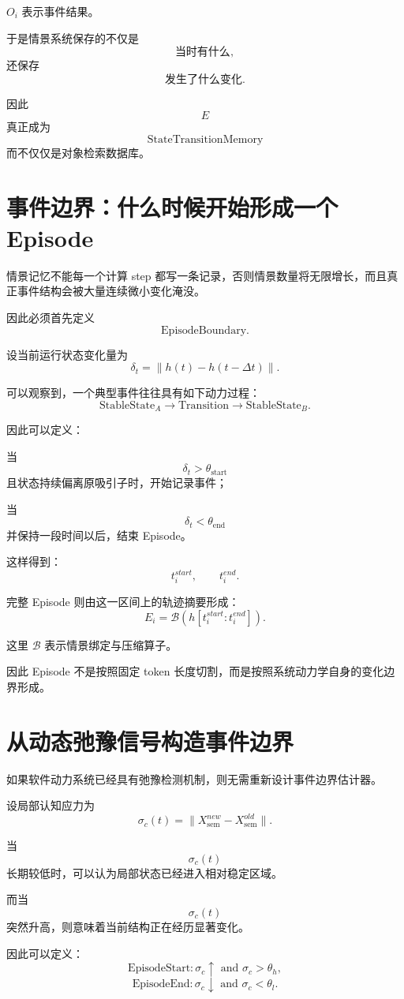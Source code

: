$O_i$ 表示事件结果。

于是情景系统保存的不仅是
\[
\text{当时有什么},
\]
还保存
\[
\boxed{
\text{发生了什么变化}.
}
\]

因此
\[
E
\]
真正成为
\[
\boxed{
\mathrm{StateTransitionMemory}
}
\]
而不仅仅是对象检索数据库。

\section{事件边界：什么时候开始形成一个Episode}

情景记忆不能每一个计算 step 都写一条记录，否则情景数量将无限增长，而且真正事件结构会被大量连续微小变化淹没。

因此必须首先定义
\[
\boxed{
\mathrm{EpisodeBoundary}.
}
\]

设当前运行状态变化量为
\[
\delta_t
=
\|h(t)-h(t-\Delta t)\|.
\]

可以观察到，一个典型事件往往具有如下动力过程：
\[
\boxed{
\mathrm{StableState}_A
\rightarrow
\mathrm{Transition}
\rightarrow
\mathrm{StableState}_B.
}
\]

因此可以定义：

当
\[
\delta_t>\theta_{\mathrm{start}}
\]
且状态持续偏离原吸引子时，开始记录事件；

当
\[
\delta_t<\theta_{\mathrm{end}}
\]
并保持一段时间以后，结束 Episode。

这样得到：
\[
t_i^{start},
\qquad
t_i^{end}.
\]

完整 Episode 则由这一区间上的轨迹摘要形成：
\[
E_i
=
\mathcal{B}
\left(
h[t_i^{start}:t_i^{end}]
\right).
\]

这里 $\mathcal{B}$ 表示情景绑定与压缩算子。

因此 Episode 不是按照固定 token 长度切割，而是按照系统动力学自身的变化边界形成。

\section{从动态弛豫信号构造事件边界}

如果软件动力系统已经具有弛豫检测机制，则无需重新设计事件边界估计器。

设局部认知应力为
\[
\sigma_c(t)
=
\|
X_{\mathrm{sem}}^{new}
-
X_{\mathrm{sem}}^{old}
\|.
\]

当
\[
\sigma_c(t)
\]
长期较低时，可以认为局部状态已经进入相对稳定区域。

而当
\[
\sigma_c(t)
\]
突然升高，则意味着当前结构正在经历显著变化。

因此可以定义：
\[
\mathrm{EpisodeStart}
:
\sigma_c
\uparrow
\text{ and }
\sigma_c>\theta_h,
\]
\[
\mathrm{EpisodeEnd}
:
\sigma_c
\downarrow
\text{ and }
\sigma_c<\theta_l.
\]

